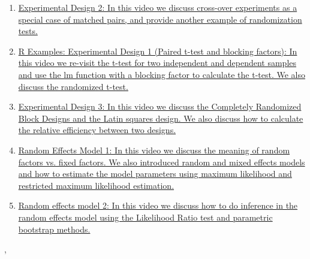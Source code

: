 \documentclass[11pt]{article}
\renewcommand{\today}{\shortmonthname[\the\month] \the \day,  \the\year}
\begin{document}
\begin{enumerate}
	\item \href{https://mp.weixin.qq.com/s/f45uvnm6FEYtMkAtGUj2jQ}{Experimental Design 2: In this video we discuss cross-over experiments as a special case of matched pairs, and provide another example of randomization tests.}	%
	\item \href{https://mp.weixin.qq.com/s/6bugSfbFOa-q0qByo3UNpg}{R Examples: Experimental Design 1 (Paired t-test and blocking factors): In this video we re-visit the t-test for two independent and dependent samples and use the lm function with a blocking factor to calculate the t-test. We also discuss the randomized t-test.}	%
	\item \href{https://mp.weixin.qq.com/s/FiysXIb8Lua13k77LOFnqg}{Experimental Design 3: In this video we discuss the Completely Randomized Block Designs and the Latin squares design. We also discuss how to calculate the relative efficiency between two designs.}	%
	\item \href{https://mp.weixin.qq.com/s/GcjqOh-ppezqWudnCm2Ksg}{Random Effects Model 1: In this video we discuss the meaning of random factors vs. fixed factors. We also introduced random and mixed effects models and how to estimate the model parameters using maximum likelihood and restricted maximum likelihood estimation.}	%
	\item \href{https://mp.weixin.qq.com/s/bv4KRjX6g5hejMB9mMAY0Q}{Random effects model 2: In this video we discuss how to do inference in the random effects model using the Likelihood Ratio test and parametric bootstrap methods.}	%
\end{enumerate}




%
\begin{flushright}
	\tiny \today 
\end{flushright}
\end{document}
